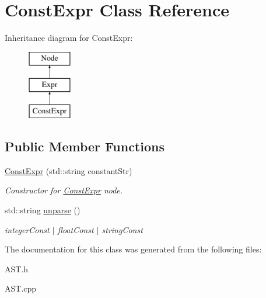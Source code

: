 \hypertarget{classConstExpr}{\section{Const\-Expr Class Reference}
\label{classConstExpr}
}
Inheritance diagram for Const\-Expr\-:\begin{figure}[H]
\begin{center}
\leavevmode
\includegraphics[height=3.000000cm]{classConstExpr}
\end{center}
\end{figure}
\subsection*{Public Member Functions}
\begin{DoxyCompactItemize}
\item 
\hypertarget{classConstExpr_a0e9fee14f48aec75145c04ef1fe81203}{\hyperlink{classConstExpr_a0e9fee14f48aec75145c04ef1fe81203}{Const\-Expr} (std\-::string constant\-Str)}\label{classConstExpr_a0e9fee14f48aec75145c04ef1fe81203}

\begin{DoxyCompactList}\small\item\em Constructor for \hyperlink{classConstExpr}{Const\-Expr} node. \end{DoxyCompactList}\item 
\hypertarget{classConstExpr_adc01f00000a931c663aedffdfcd132ad}{std\-::string \hyperlink{classConstExpr_adc01f00000a931c663aedffdfcd132ad}{unparse} ()}\label{classConstExpr_adc01f00000a931c663aedffdfcd132ad}

\begin{DoxyCompactList}\small\item\em integer\-Const $\vert$ float\-Const $\vert$ string\-Const \end{DoxyCompactList}\end{DoxyCompactItemize}


The documentation for this class was generated from the following files\-:\begin{DoxyCompactItemize}
\item 
A\-S\-T.\-h\item 
A\-S\-T.\-cpp\end{DoxyCompactItemize}
